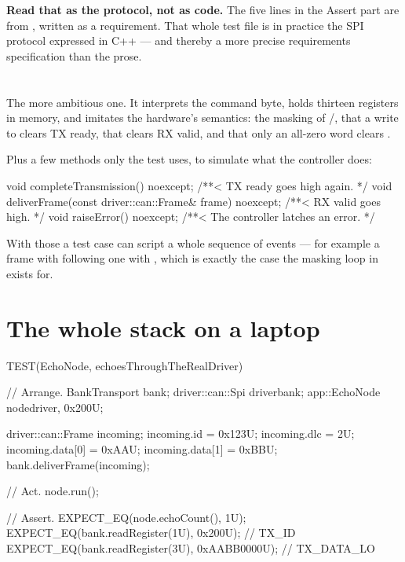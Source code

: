 \textbf{Read that as the protocol, not as code.} The five lines in the Assert part are
 from , written as a requirement. That whole test file is in
practice the SPI protocol expressed in C++ --- and thereby a more precise requirements
specification than the prose.

\section{\texorpdfstring{}{BankTransport}}
\label{sec:bank}

The more ambitious one. It interprets the command byte, holds thirteen registers in memory, and
imitates the hardware's semantics: the masking of /, that a write to
 clears TX ready, that  clears RX valid, and that only an all-zero word
clears .

Plus a few methods only the test uses, to simulate what the controller does:

\begin{cppcode}
void completeTransmission() noexcept;              /**< TX ready goes high again. */
void deliverFrame(const driver::can::Frame& frame) noexcept;  /**< RX valid goes high. */
void raiseError() noexcept;                        /**< The controller latches an error. */
\end{cppcode}

With those a test case can script a whole sequence of events --- for example a frame with
 following one with , which is exactly the case the masking loop in
 exists for.

\section{The whole stack on a laptop}
\label{sec:wholestack}

\begin{cppcode}
TEST(EchoNode, echoesThroughTheRealDriver)
{
    // Arrange.
    BankTransport bank{};
    driver::can::Spi driver{bank};
    app::EchoNode node{driver, 0x200U};

    driver::can::Frame incoming{};
    incoming.id      = 0x123U;
    incoming.dlc     = 2U;
    incoming.data[0] = 0xAAU;
    incoming.data[1] = 0xBBU;
    bank.deliverFrame(incoming);

    // Act.
    node.run();

    // Assert.
    EXPECT_EQ(node.echoCount(), 1U);
    EXPECT_EQ(bank.readRegister(1U), 0x200U);      // TX_ID
    EXPECT_EQ(bank.readRegister(3U), 0xAABB0000U); // TX_DATA_LO
}
\end{cppcode}


